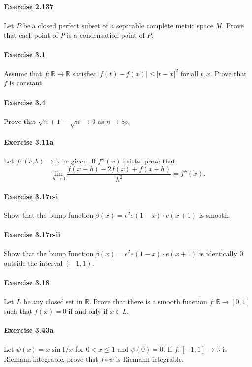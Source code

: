 \documentclass{article}
\begin{document}
\paragraph{Exercise 2.137} Let $P$ be a closed perfect subset of a separable complete metric space $M$. Prove that each point of $P$ is a condensation point of $P$.


\paragraph{Exercise 3.1} Assume that $f \colon \mathbb{R} \rightarrow \mathbb{R}$ satisfies $|f(t)-f(x)| \leq|t-x|^{2}$ for all $t, x$. Prove that $f$ is constant.


\paragraph{Exercise 3.4} Prove that $\sqrt{n+1}-\sqrt{n} \rightarrow 0$ as $n \rightarrow \infty$.


\paragraph{Exercise 3.11a} Let $f \colon (a, b) \rightarrow \mathbb{R}$ be given.  If $f''(x)$ exists, prove that \[\lim_{h \rightarrow 0} \frac{f(x - h) - 2f(x) + f(x + h)}{h^2} = f''(x).\]


\paragraph{Exercise 3.17c-i} Show that the bump function $\beta(x)=e^{2} e(1-x) \cdot e(x+1)$ is smooth.


\paragraph{Exercise 3.17c-ii} Show that the bump function $\beta(x)=e^{2} e(1-x) \cdot e(x+1)$ is identically 0 outside the interval $(-1, 1)$.


\paragraph{Exercise 3.18} Let $L$ be any closed set in $\mathbb{R}$. Prove that there is a smooth function $f \colon \mathbb{R} \rightarrow [0, 1]$ such that $f(x) = 0$ if and only if $x \in L$.


\paragraph{Exercise 3.43a} Let $\psi(x) = x \sin 1/x$ for $0 < x \leq 1$ and $\psi(0) = 0$.  If $f \colon [-1, 1] \rightarrow \mathbb{R}$ is Riemann integrable, prove that $f \circ \psi$ is Riemann integrable.
\end{document}
